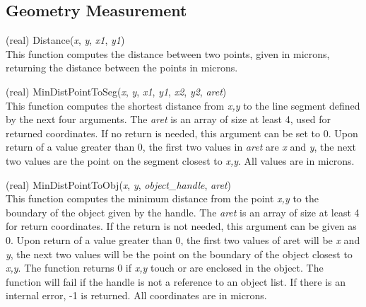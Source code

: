 \subsection{Geometry Measurement}

\begin{description}
\item{(real) \vt Distance({\it x\/}, {\it y\/}, {\it x1\/}, {\it y1\/})}\\
This function computes the distance between two points, given in
microns, returning the distance between the points in microns.

\item{(real) \vt MinDistPointToSeg({\it x\/}, {\it y\/}, {\it x1\/},
 {\it y1\/}, {\it x2\/}, {\it y2\/}, {\it aret\/})}\\
This function computes the shortest distance from {\it x,y} to the
line segment defined by the next four arguments.  The {\it aret} is an
array of size at least 4, used for returned coordinates.  If no return
is needed, this argument can be set to 0.  Upon return of a value
greater than 0, the first two values in {\it aret} are {\it x} and
{\it y}, the next two values are the point on the segment closest to
{\it x,y}.  All values are in microns.

\item{(real) \vt MinDistPointToObj({\it x\/}, {\it y\/},
 {\it object\_handle\/}, {\it aret\/})}\\
This function computes the minimum distance from the point {\it x,y}
to the boundary of the object given by the handle.  The {\it aret} is
an array of size at least 4 for return coordinates.  If the return is
not needed, this argument can be given as 0.  Upon return of a value
greater than 0, the first two values of aret will be {\it x} and {\it
y}, the next two values will be the point on the boundary of the
object closest to {\it x,y}.  The function returns 0 if {\it x,y}
touch or are enclosed in the object.  The function will fail if the
handle is not a reference to an object list.  If there is an internal
error, -1 is returned.  All coordinates are in microns.


\end{description}
